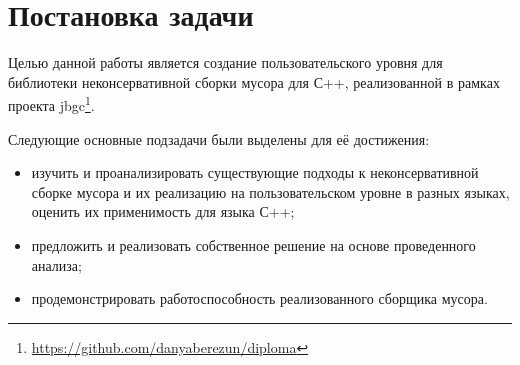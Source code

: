 \section{Постановка задачи}
Целью данной работы является создание пользовательского уровня для библиотеки неконсервативной сборки 
мусора для С++, реализованной в рамках проекта jbgc\footnote{\url{https://github.com/danyaberezun/diploma}}.


\vspace{0.3cm}
Следующие основные подзадачи были выделены для её достижения:
\begin{itemize}
\item изучить и проанализировать существующие подходы к неконсервативной сборке мусора и их 
реализацию на пользовательском уровне в разных языках, оценить их применимость для языка С++;

\item предложить и реализовать собственное решение на основе проведенного анализа;

\item продемонстрировать работоспособность реализованного сборщика мусора.
\end{itemize}
